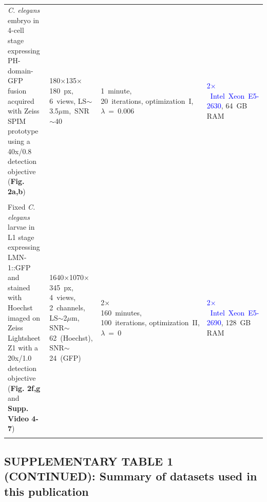 \documentclass[]{spie}  %
\begin{document}
\begin{savenotes}
\begin{table}[h!]
{\begin{tabular}{p{5.5cm}p{3.0cm}p{3.6cm}p{3.5cm}}
\\
\emph{C. elegans} embryo in 4-cell stage expressing PH-domain-GFP fusion acquired with Zeiss SPIM prototype using a 40x/0.8 detection objective (\textbf{Fig. 2a,b})\setcounter{restorecntr1}{\value{footnote}}\setcounter{footnote}{\value{savecntr1}}\footnotemark \setcounter{footnote}{\value{restorecntr1}} & \mbox{180$\times$135$\times$180~px}, \mbox{6~views}, \mbox{LS$\sim$3.5$\mu$m, SNR$\sim$40} & \mbox{1 minute,~~~~~~~~~~~~~~~~} \mbox{20 iterations}, \mbox{optimization I}, $\lambda$~=~0.006 & \mbox{\textcolor{blue}{2$\times$~Intel~Xeon E5-2630}}, 64~GB RAM\\
\\
Fixed \emph{C. elegans} larvae in L1 stage expressing LMN-1::GFP and stained with Hoechst imaged on Zeiss Lightsheet Z1 with a 20x/1.0 detection objective (\textbf{Fig. 2f,g} and \textbf{Supp. Video 4-7}) & \mbox{1640$\times$1070$\times$345~px}, \mbox{4 views}, \mbox{2~channels}, \mbox{LS$\sim$2$\mu$m}, \mbox{SNR$\sim$62 (Hoechst)}, \mbox{SNR$\sim$24 (GFP)} & \mbox{2$\times$160 minutes,~~~~~~~~~~~~~~~~} \mbox{100 iterations}, \mbox{optimization II}, $\lambda$~=~0 & \mbox{\textcolor{blue}{2$\times$~Intel~Xeon E5-2690}}, 128~GB RAM \\
\\
\end{tabular}}
\caption{ }
\label{tab:experiments}
\end{table}
\end{savenotes}

\hspace{20mm}

\subsection*{SUPPLEMENTARY TABLE 1 (CONTINUED): Summary of datasets used in this publication}

\hspace{20mm}
\end{document}
